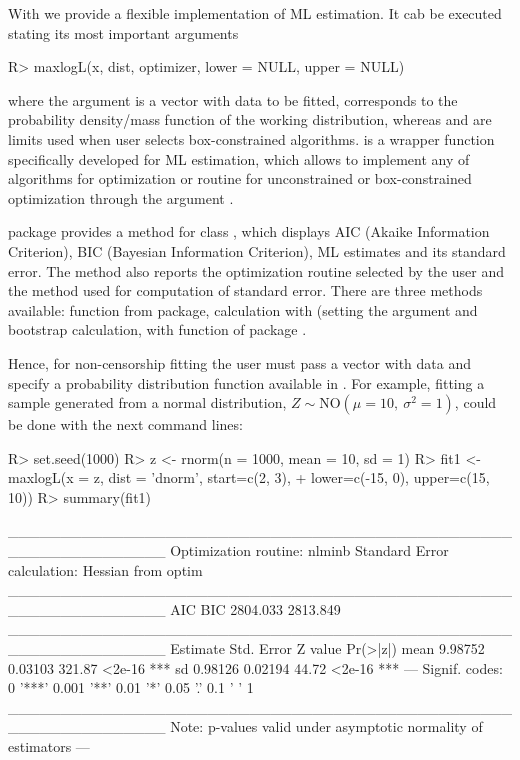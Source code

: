 \documentclass[nojss]{jss}
\begin{document}
With  we provide a flexible implementation of ML estimation. It cab be executed stating its most important arguments

\begin{Schunk}
\begin{Sinput}
R> maxlogL(x, dist, optimizer, lower = NULL, upper = NULL)
\end{Sinput}
\end{Schunk}

where the argument  is a vector with data to be fitted,  corresponds to the probability density/mass function of the working distribution, whereas  and  are limits used when user selects box-constrained algorithms.  is a wrapper function specifically developed for ML estimation, which allows to implement any of  algorithms for optimization or  routine for unconstrained or box-constrained optimization through the argument .

 package provides a  method for class , which displays AIC (Akaike Information Criterion), BIC (Bayesian Information Criterion), ML estimates and its standard error. The method also reports the optimization routine selected by the user and the method used for computation of standard error. There are three methods available:  function from  package, calculation with  (setting the argument  and bootstrap calculation, with  function of  package \citep{Davison1997, Canty2017}.

Hence, for non-censorship fitting the user must pass a vector with data and specify a probability distribution function available in . For example, fitting a sample generated from a normal distribution, $Z \sim \text{NO}(\mu=10,\: \sigma^2=1)$, could be done with the next command lines:

\begin{Schunk}
\begin{Sinput}
R> set.seed(1000)
R> z <- rnorm(n = 1000, mean = 10, sd = 1)
R> fit1 <- maxlogL(x = z, dist = 'dnorm', start=c(2, 3),
+                  lower=c(-15, 0), upper=c(15, 10))
R> summary(fit1)
\end{Sinput}
\begin{Soutput}
_______________________________________________________________
Optimization routine: nlminb 
Standard Error calculation: Hessian from optim 
_______________________________________________________________
       AIC      BIC
  2804.033 2813.849
_______________________________________________________________
     Estimate  Std. Error Z value Pr(>|z|)    
mean   9.98752    0.03103  321.87   <2e-16 ***
sd     0.98126    0.02194   44.72   <2e-16 ***
---
Signif. codes:  0 '***' 0.001 '**' 0.01 '*' 0.05 '.' 0.1 ' ' 1
_______________________________________________________________
Note: p-values valid under asymptotic normality of estimators 
---
\end{Soutput}
\end{Schunk}
\end{document}
